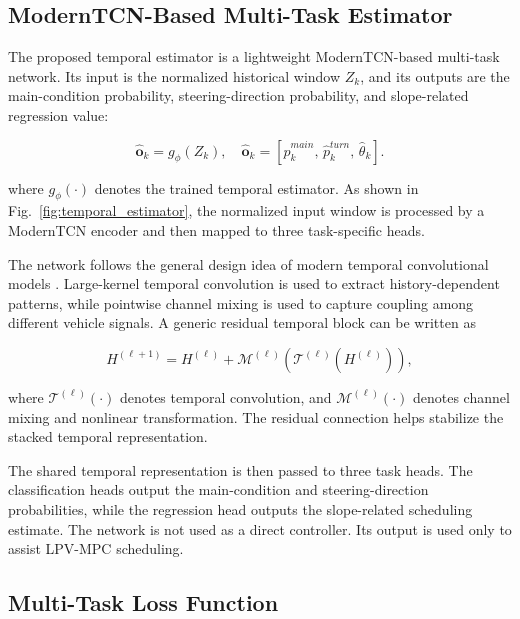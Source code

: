 \documentclass{ieeeaccess}
\newcommand{\citep}[1]{\cite{#1}}
\begin{document}
\subsection{ModernTCN-Based Multi-Task Estimator}



The proposed temporal estimator is a lightweight ModernTCN-based multi-task network. Its input is the normalized historical window $Z_k$, and its outputs are the main-condition probability, steering-direction probability, and slope-related regression value:

\begin{equation}
\hat{\mathbf{o}}_k
=
g_{\phi}(Z_k),
\quad
\hat{\mathbf{o}}_k
=
\left[
\hat{p}^{main}_k,\,
\hat{p}^{turn}_k,\,
\hat{\theta}_k
\right].
\label{eq:multi_task_estimator}
\end{equation}

where $g_{\phi}(\cdot)$ denotes the trained temporal estimator. As shown in Fig.~\ref{fig:temporal_estimator}, the normalized input window is processed by a ModernTCN encoder and then mapped to three task-specific heads.

The network follows the general design idea of modern temporal convolutional models \citep{}. Large-kernel temporal convolution is used to extract history-dependent patterns, while pointwise channel mixing is used to capture coupling among different vehicle signals. A generic residual temporal block can be written as

\begin{equation}
H^{(\ell+1)}
=
H^{(\ell)}
+
\mathcal{M}^{(\ell)}
\left(
\mathcal{T}^{(\ell)}
\left(H^{(\ell)}\right)
\right),
\label{eq:temporal_block}
\end{equation}

where $\mathcal{T}^{(\ell)}(\cdot)$ denotes temporal convolution, and $\mathcal{M}^{(\ell)}(\cdot)$ denotes channel mixing and nonlinear transformation. The residual connection helps stabilize the stacked temporal representation.



The shared temporal representation is then passed to three task heads. The classification heads output the main-condition and steering-direction probabilities, while the regression head outputs the slope-related scheduling estimate. The network is not used as a direct controller. Its output is used only to assist LPV-MPC scheduling.



\subsection{Multi-Task Loss Function}
\end{document}
